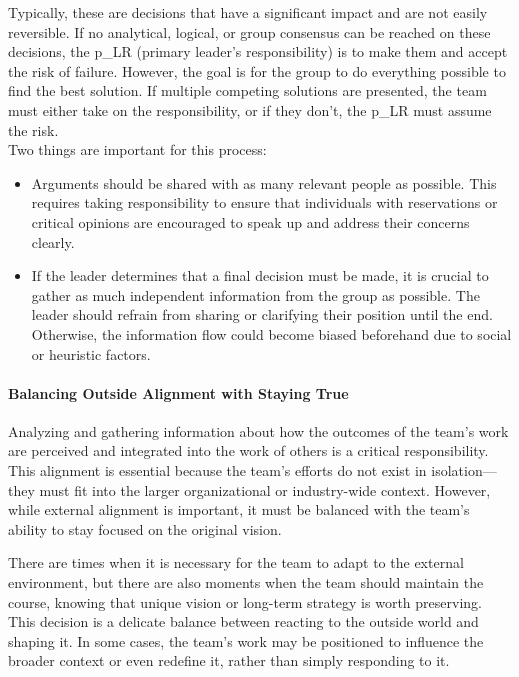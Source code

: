 Typically, these are decisions that have a significant impact and are not easily reversible. If no analytical, logical, or group consensus can be reached on these decisions, the \gls{p_LR} (primary leader's responsibility) is to make them and accept the risk of failure. However, the goal is for the group to do everything possible to find the best solution. If multiple competing solutions are presented, the team must either take on the responsibility, or if they don't, the \gls{p_LR} must assume the risk.\\

Two things are important for this process:
\begin{itemize}
	\item Arguments should be shared with as many relevant people as possible. This requires taking responsibility to ensure that individuals with reservations or critical opinions are encouraged to speak up and address their concerns clearly.
	\item If the leader determines that a final decision must be made, it is crucial to gather as much independent information from the group as possible. The leader should refrain from sharing or clarifying their position until the end. Otherwise, the information flow could become biased beforehand due to social or heuristic factors.
\end{itemize}

\paragraph{Balancing Outside Alignment with Staying True}

Analyzing and gathering information about how the outcomes of the team's work are perceived and integrated into the work of others is a critical responsibility. This alignment is essential because the team's efforts do not exist in isolation—they must fit into the larger organizational or industry-wide context. However, while external alignment is important, it must be balanced with the team’s ability to stay focused on the original vision. 

There are times when it is necessary for the team to adapt to the external environment, but there are also moments when the team should maintain the course, knowing that unique vision or long-term strategy is worth preserving. This decision is a delicate balance between reacting to the outside world and shaping it. In some cases, the team’s work may be positioned to influence the broader context or even redefine it, rather than simply responding to it.

